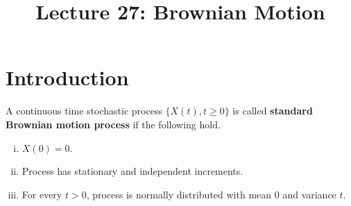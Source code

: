 \documentclass[a4paper,10pt,english]{article}
\title{Lecture 27: Brownian Motion}
\author{}
\begin{document}
\maketitle
\section{Introduction}
\begin{defn} A continuous time stochastic process $\{X(t), t \geqslant 0\}$ is called \textbf{standard Brownian motion process} if the following hold.
\begin{enumerate}[i)]
\item $X(0) = 0$.
\item Process has stationary and independent increments.
\item For every $t > 0$, process is normally distributed with mean $0$ and variance $t$.
\end{enumerate}
\end{defn}
\end{document}
